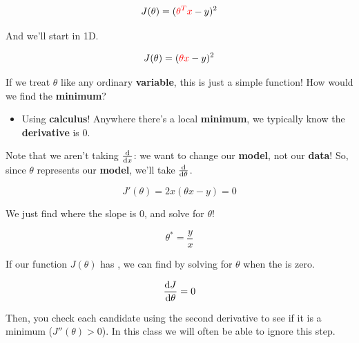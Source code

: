         \begin{equation}
            J(\theta) = (\textcolor{red}{ \theta^T x  } - y )^2
        \end{equation}
        
        And we'll start in 1D.
        
        \begin{equation}
            J(\theta) = (\textcolor{red}{\theta x}   - y )^2
        \end{equation}
        
        If we treat $\theta$ like any ordinary \textbf{variable}, this is just a simple function! How would we find the \textbf{minimum}? 

        \begin{itemize}
            \item Using \textbf{calculus}! Anywhere there's a local \textbf{minimum}, we typically know the \textbf{derivative} is 0.
        \end{itemize}

        Note that we aren't taking $\frac{\dd }{\dd x}$: we want to change our \textbf{model}, not our \textbf{data}! So, since $\theta$ represents our \textbf{model}, we'll take $\frac{\dd }{\dd \theta}$.
        
        \begin{equation}
            J'(\theta) = 2x(\theta x - y ) = 0
        \end{equation}
        
        We just find where the slope is 0, and solve for $\theta$!
        
        \begin{equation}
            \theta^* = \frac{y}{x}
        \end{equation}
        
        \begin{concept}
            
            If our function $J(\theta)$ has , we can  find  by solving for $\theta$ when the  is zero.
            
            \begin{equation*}
                \frac{\dd J}{\dd \theta}=0
            \end{equation*}
            
            Then, you check each candidate using the second derivative to see if it is a minimum ($J''(\theta)>0$). In this class we will often be able to ignore this step.
        \end{concept}
        
